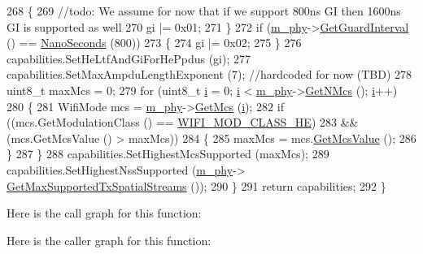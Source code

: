 \begin{DoxyCode}
268         \{
269           \textcolor{comment}{//todo: We assume for now that if we support 800ns GI then 1600ns GI is supported as well}
270           gi |= 0x01;
271         \}
272       \textcolor{keywordflow}{if} (\hyperlink{classns3_1_1RegularWifiMac_a1a6dad8eb0a057a4e1b459f518457a4c}{m\_phy}->\hyperlink{classns3_1_1WifiPhy_adb22fbf368dfbf0864f08319d8fcb86e}{GetGuardInterval} () == \hyperlink{group__timecivil_ga281d64bcb4dad96267d83c7688ec433f}{NanoSeconds} (800))
273         \{
274           gi |= 0x02;
275         \}
276       capabilities.SetHeLtfAndGiForHePpdus (gi);
277       capabilities.SetMaxAmpduLengthExponent (7); \textcolor{comment}{//hardcoded for now (TBD)}
278       uint8\_t maxMcs = 0;
279       \textcolor{keywordflow}{for} (uint8\_t \hyperlink{bernuolliDistribution_8m_a6f6ccfcf58b31cb6412107d9d5281426}{i} = 0; \hyperlink{bernuolliDistribution_8m_a6f6ccfcf58b31cb6412107d9d5281426}{i} < \hyperlink{classns3_1_1RegularWifiMac_a1a6dad8eb0a057a4e1b459f518457a4c}{m\_phy}->\hyperlink{classns3_1_1WifiPhy_aede1b3de380510e387aaafcfda7a0db0}{GetNMcs} (); \hyperlink{bernuolliDistribution_8m_a6f6ccfcf58b31cb6412107d9d5281426}{i}++)
280         \{
281           WifiMode mcs = \hyperlink{classns3_1_1RegularWifiMac_a1a6dad8eb0a057a4e1b459f518457a4c}{m\_phy}->\hyperlink{classns3_1_1WifiPhy_a6a8740a6fbb7ff618c80e0a0867467fd}{GetMcs} (\hyperlink{bernuolliDistribution_8m_a6f6ccfcf58b31cb6412107d9d5281426}{i});
282           \textcolor{keywordflow}{if} ((mcs.GetModulationClass () == \hyperlink{namespacens3_aa999e1221606a2b21b1eb33c2007c217abfa4f7272510045a9b43e8ac27ac13b0}{WIFI\_MOD\_CLASS\_HE})
283               && (mcs.GetMcsValue () > maxMcs))
284             \{
285               maxMcs = mcs.\hyperlink{classns3_1_1WifiMode_acd40f9e0edfc1e2c4462bd016a08f160}{GetMcsValue} ();
286             \}
287         \}
288       capabilities.SetHighestMcsSupported (maxMcs);
289       capabilities.SetHighestNssSupported (\hyperlink{classns3_1_1RegularWifiMac_a1a6dad8eb0a057a4e1b459f518457a4c}{m\_phy}->
      \hyperlink{classns3_1_1WifiPhy_ab5e6bb95a75d0e6e7e666efd3c014fe4}{GetMaxSupportedTxSpatialStreams} ());
290     \}
291   \textcolor{keywordflow}{return} capabilities;
292 \}
\end{DoxyCode}


Here is the call graph for this function\+:




Here is the caller graph for this function\+:


